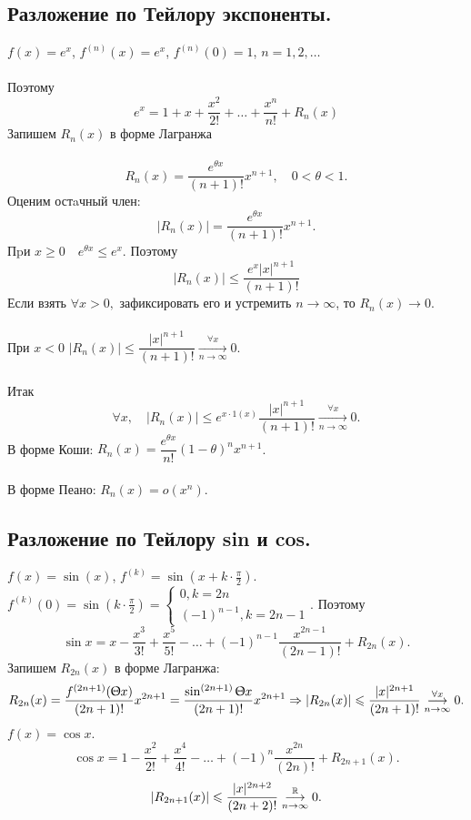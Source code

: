 	\subsection{Разложение по Тейлору экспоненты.}
	$f(x)=e^x$, $f^{(n)}(x)=e^x$, $f^{(n)}(0)=1$, $n=1,2,\dots$\\\\
	Поэтому $$e^x=1+x+\frac{x^2}{2!}+\dots+\frac{x^n}{n!}+R_n(x)$$
	Запишем $R_n(x)$  в форме Лагранжа\\\\
	$$R_n(x)=\frac{e^{\theta x}}{(n+1)!}x^{n+1}, \quad 0<\theta<1.$$
	Оценим остaчный член:
	$$|R_n(x)|=\frac{e^{\theta x}}{(n+1)!}x^{n+1}.$$
	Пpи $x \ge 0 \quad e^{\theta x} \le e^x.$ Поэтому
	$$|R_n(x)| \le \frac{e^x|x|^{n+1}}{(n+1)!}$$
	Если взять $\forall x>0,$ зафиксировать его и устремить $n \to \infty$, то $R_n(x) \to 0$.\\\\
	При $x < 0$ $|R_n(x)| \le \dfrac{|x|^{n+1}}{(n+1)!} \underset{n \to \infty}{\overset{\forall x}{\longrightarrow}}0.$\\\\
	Итак $$\forall x, \quad |R_n(x)| \le e^{x \cdot 1(x)} \frac{|x|^{n+1}}{(n+1)!} \underset{n \to \infty}{\overset{\forall x}{\longrightarrow}} 0.$$
	В форме Коши: $R_n(x)=\dfrac{e^{\theta x}}{n!}(1-\theta)^n x^{n+1}$.\\\\
	В форме Пеано: $R_n(x)=o(x^n)$.
	\subsection{Разложение по Тейлору sin и cos.}
	$f(x)=\sin(x)$, $f^{(k)}=\sin(x+k \cdot \frac{\pi}{2})$.\\
	$f^{(k)}(0)=\sin(k \cdot \frac{\pi}{2})=\begin{cases}
		0, k=2n\\
		(-1)^{n-1}, k=2n-1
	\end{cases}$.
	Поэтому
	$$\sin x=x-\frac{x^3}{3!}+\frac{x^5}{5!}-\ldots+(-1)^{n-1}\frac{x^{2n-1}}{(2n-1)!}+R_{2n}(x).$$
	Запишем $R_{2n}(x)$ в форме Лагранжа:
	$$R_{2n}(x)=\frac{f^{(2n+1)}(\Uptheta x)}{(2n+1)!}x^{2n+1}=\frac{\sin^{(2n+1)}\Uptheta x}{(2n+1)!}x^{2n+1} \Rightarrow |R_{2n}(x)| \leqslant \frac{|x|^{2n+1}}{(2n+1)!} \underset{n \to \infty}{\overset{\forall x}{\longrightarrow}} 0.$$
	$f(x) = \cos x$.
	\[\cos x = 1 - \frac{x^2}{2!} + \frac{x^4}{4!} - \ldots + (-1)^n\frac{x^{2n}}{(2n)!} + R_{2n+1}(x). \]
	$$|R_{2n+1}(x)| \leqslant \frac{|x|^{2n+2}}{(2n+2)!}\underset{n \to \infty}{\overset{\mathbb{R}}{\longrightarrow}}0.$$

